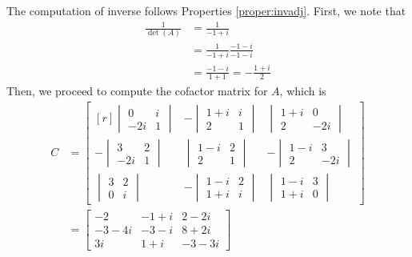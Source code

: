 \begin{solution}
The computation of inverse follows Properties \ref{proper:invadj}. First, we note that
\begin{align*}
\frac{1}{\det(A)} &= \frac{1}{-1+i} \\
&= \frac{1}{-1+i} \frac{-1-i}{-1-i} \\
&= \frac{-1-i}{1+1} = -\frac{1+i}{2}
\end{align*}
Then, we proceed to compute the cofactor matrix for $A$, which is
\begin{align*}
C &=
\begin{bmatrix*}[r]
\begin{vmatrix}
0 & i \\
-2i & 1
\end{vmatrix} &
-\begin{vmatrix}
1+i & i \\
2 & 1
\end{vmatrix} &
\begin{vmatrix}
1+i & 0 \\
2 & -2i
\end{vmatrix} \\[10pt]
-\begin{vmatrix}
3 & 2 \\
-2i & 1
\end{vmatrix} &
\begin{vmatrix}
1-i & 2 \\
2 & 1
\end{vmatrix} &
-\begin{vmatrix}
1-i & 3 \\
2 & -2i
\end{vmatrix} \\[10pt]
\begin{vmatrix}
3 & 2 \\
0 & i
\end{vmatrix} &
-\begin{vmatrix}
1-i & 2 \\
1+i & i
\end{vmatrix} &
\begin{vmatrix}
1-i & 3 \\
1+i & 0
\end{vmatrix}
\end{bmatrix*} \\
&= 
\begin{bmatrix}
-2 & -1+i & 2-2i \\
-3-4i & -3-i & 8+2i \\
3i & 1+i & -3-3i
\end{bmatrix}

\end{align*}
\end{solution}
